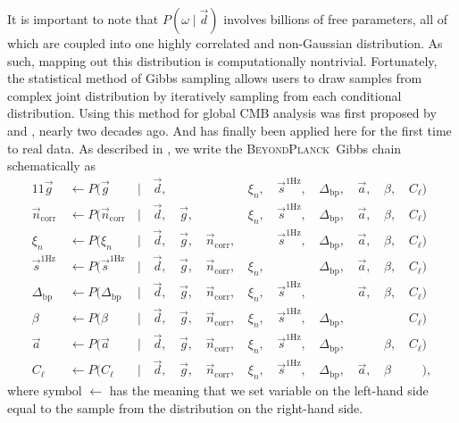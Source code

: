 \documentclass[twocolumn]{aa}
\renewcommand{\d}[0]{\vec{d}}
\newcommand{\n}[0]{\vec{n}}
\newcommand{\s}[0]{\vec{s}}
\renewcommand{\a}[0]{\vec{a}}
\newcommand{\g}[0]{\vec{g}}
\newcommand{\Dbp}[0]{\Delta_{\mathrm{bp}}}
\newcommand{\BP}{\textsc{BeyondPlanck}}
\begin{document}
It is important to note that $P(\omega\mid\d)$ involves billions of free
parameters, all of which are coupled into one highly correlated and
non-Gaussian distribution. As such, mapping out this distribution is
computationally nontrivial. Fortunately, the statistical method of
Gibbs sampling \citep{geman:1984} allows users to draw samples from
complex joint distribution by iteratively sampling from each
conditional distribution. Using this method for global CMB analysis
was first proposed by \citet{jewell2004} and \citet{wandelt2004},
nearly two decades ago. And has finally been applied here for the first time to real data.
As described in \citealp{bp01}, we write the
\BP\ Gibbs chain schematically as
\begin{alignat}{11}
\g &\,\leftarrow P(\g&\,|&\,\d,&\, & &\,\xi_n, &\,\s^{\mathrm{1Hz}},
&\,\Dbp, &\,\a, &\,\beta, &\,C_{\ell}) \label{eq:gain}\\
\n_{\mathrm{corr}} &\,\leftarrow P(\n_{\mathrm{corr}}&\,|&\,\d, &\,\g, &\,&\,\xi_n, &\,\s^{\mathrm{1Hz}},
&\,\Dbp, &\,\a, &\,\beta, &\,C_{\ell}) \label{eq:ncorr}\\
\xi_n &\,\leftarrow P(\xi_n&\,|&\,\d, &\,\g, &\,\n_{\mathrm{corr}}, &\,&\,\s^{\mathrm{1Hz}},
&\,\Dbp, &\,\a, &\,\beta, &\,C_{\ell})\\
\s^{\mathrm{1Hz}} &\,\leftarrow P(\s^{\mathrm{1Hz}}&\,|&\,\d, &\,\g, &\,\n_{\mathrm{corr}}, &\,\xi_n,
&\,&\,\Dbp, &\,\a, &\,\beta, &\,C_{\ell})\\
\Dbp &\,\leftarrow P(\Dbp&\,|&\,\d, &\,\g, &\,\n_{\mathrm{corr}}, &\,\xi_n, &\,\s^{\mathrm{1Hz}},
&\,&\,\a, &\,\beta, &\,C_{\ell})\\
\beta &\,\leftarrow P(\beta&\,|&\,\d, &\,\g, &\,\n_{\mathrm{corr}}, &\,\xi_n, &\,\s^{\mathrm{1Hz}},
&\,\Dbp, & &\,&\,C_{\ell})\\
\a &\,\leftarrow P(\a&\,|&\,\d, &\,\g, &\,\n_{\mathrm{corr}}, &\,\xi_n, &\,\s^{\mathrm{1Hz}},
&\,\Dbp, &\,&\,\beta, &\,C_{\ell})\\
C_{\ell} &\,\leftarrow P(C_{\ell}&\,|&\,\d, &\,\g, &\,\n_{\mathrm{corr}}, &\,\xi_n, &\,\s^{\mathrm{1Hz}},
	&\,\Dbp, &\,\a, &\,\beta\phantom{,}&\,\phantom{C_{\ell}}),\label{eq:cl}
\end{alignat}
where symbol $\leftarrow$ has the meaning that we set variable on the
left-hand side equal to the sample from the distribution on the
right-hand side. 
\end{document}
